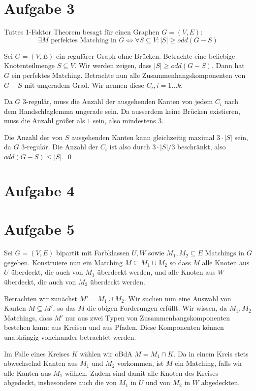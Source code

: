 \documentclass[a4paper]{article}
\begin{document}
\section{Aufgabe 3}
Tuttes 1-Faktor Theorem besagt für einen Graphen $G = (V, E)$:
\[
	\exists M \text{ perfektes Matching in } G \Leftrightarrow
	\forall S \subseteq V: |S| \geq odd(G - S)
\]

Sei $G = (V, E)$ ein regulärer Graph ohne Brücken.
Betrachte eine beliebige Knotenteilmenge $S \subseteq V$.
Wir werden zeigen, dass $|S| \geq odd(G - S)$. Dann hat $G$ ein perfektes
Matching.
Betrachte nun alle Zusammenhangskomponenten von $G - S$ mit ungeradem Grad.
Wir nennen diese $C_i, i = 1 ... k$.

Da $G$ 3-regulär, muss die Anzahl der ausgehenden Kanten von jedem $C_i$
nach dem Handschlaglemma ungerade sein. Da ausserdem keine Brücken
existieren, muss die Anzahl größer als $1$ sein, also mindestens $3$.

Die Anzahl der von $S$ ausgehenden Kanten kann gleichzeitig maximal
$3 \cdot |S|$ sein, da $G$ 3-regulär.
Die Anzahl der $C_i$ ist also durch $3 \cdot |S| / 3$ beschränkt, also
$odd(G - S) \leq |S|$.
\qed

\section{Aufgabe 4}

\section{Aufgabe 5}
Sei $G = (V, E)$ bipartit mit Farbklassen $U, W$ sowie $M_1, M_2 \subseteq E$ Matchings in $G$
gegeben. Konstruiere nun ein Matching $M \subseteq M_1 \cup M_2$ so dass $M$
alle Knoten aus $U$ überdeckt, die auch von $M_1$ überdeckt werden, und alle
Knoten aus $W$ überdeckt, die auch von $M_2$ überdeckt werden.

Betrachten wir zunächst $M' = M_1 \cup M_2$. Wir suchen nun eine Auswahl von
Kanten $M \subseteq M'$, so das $M$ die obigen Forderungen erfüllt.
Wir wissen, da $M_1, M_2$
Matchings, dass $M'$ nur aus zwei Typen von Zusammenhangskomponenten
bestehen kann: aus Kreisen und aus Pfaden. Diese Komponenten können
unabhängig voneinander betrachtet werden.

Im Falle eines Kreises $K$ wählen wir oBdA $M = M_1 \cap K$. Da in einem
Kreis stets abwechselnd Kanten aus $M_1$ und $M_2$ vorkommen, ist $M$ ein
Matching, falls wir alle Kanten aus $M_1$ wählen. Zudem sind damit alle
Knoten des Kreises abgedeckt, insbesondere auch die von $M_1$ in $U$ und von
$M_2$ in $W$ abgedeckten.
\end{document}
